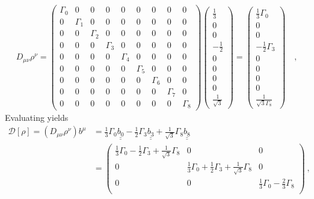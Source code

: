 \begin{align} \label{eq:deco_operator_coefficients}
    D_{\mu\nu}\rho^\nu
    = 
\begin{pmatrix}
\Gamma_0 & 0 & 0 & 0 & 0 & 0 & 0 & 0 & 0 \\
0 & \Gamma_1 & 0 & 0 & 0 & 0 & 0 & 0 & 0 \\
0 & 0 & \Gamma_2 & 0 & 0 & 0 & 0 & 0 & 0 \\
0 & 0 & 0 & \Gamma_3 & 0 & 0 & 0 & 0 & 0 \\
0 & 0 & 0 & 0 & \Gamma_4 & 0 & 0 & 0 & 0  \\
0 & 0 & 0 & 0 & 0 & \Gamma_5 & 0 & 0 & 0 \\
0 & 0 & 0 & 0 & 0 & 0 & \Gamma_6 & 0 & 0 \\
0 & 0 & 0 & 0 & 0 & 0 & 0 & \Gamma_7 & 0 \\
0 & 0 & 0 & 0 & 0 & 0 & 0 & 0 & \Gamma_8
\end{pmatrix}
%
    \begin{pmatrix}
    \frac{1}{3} \\ 0 \\ 0 \\ - \frac{1}{2} \\ 0 \\ 0 \\ 0 \\ 0 \\ \frac{1}{\sqrt{3}}    
    \end{pmatrix}
    =
    \begin{pmatrix}
    \frac{1}{3} \Gamma_0 \\ 0 \\ 0 \\ - \frac{1}{2} \Gamma_3 \\ 0 \\ 0 \\ 0 \\ 0 \\ \frac{1}{\sqrt{3} \Gamma_8}
    \end{pmatrix}
    \quad \text{,}
\end{align}
%
Evaluating  yields
%
\begin{align} \label{eq:deco_operator_expansion}
   \mathcal{D}[\rho] = (D_{\mu\nu}\rho^\nu)b^\mu
   &=
   \frac{1}{3}\Gamma_0\underline{\underline{b_0}} - \frac{1}{2} \Gamma_3 \underline{\underline{b_3}} + \frac{1}{\sqrt{3}} \Gamma_8 \underline{\underline{b_8}} \\
   &=
        \begin{pmatrix}
            \frac{1}{3}\Gamma_0 - \frac{1}{2} \Gamma_3 + \frac{1}{\sqrt{3}} \Gamma_8  & 0 & 0 \\
            0 & \frac{1}{3}\Gamma_0 + \frac{1}{2} \Gamma_3 + \frac{1}{\sqrt{3}} \Gamma_8  & 0 \\
            0 & 0 & \frac{1}{3}\Gamma_0 - \frac{2}{3} \Gamma_8  \\
        \end{pmatrix}  
   \ ,
\end{align}
%
\fi






